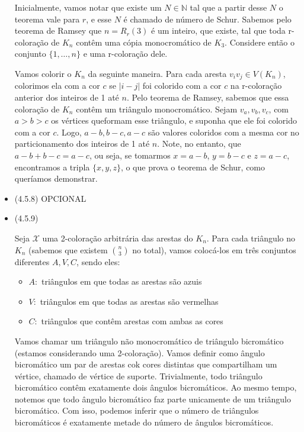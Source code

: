 \documentclass{article}
\begin{document}
\begin{itemize}
	      Inicialmente, vamos notar que existe um \(N \in \mathbb{N}\) tal que a partir desse \(N\) o teorema vale para \(r\), e esse \(N\) é chamado de número de
	      Schur. Sabemos pelo teorema de Ramsey que \(n = R_r(3)\) é um inteiro, que existe, tal que
	      toda r-coloração de \(K_n\) contêm uma cópia monocromático de \(K_3\).
	      Considere então o conjunto \(\{1, \dots, n\}\) e uma r-coloração dele.

	      Vamos colorir o \(K_n\) da seguinte maneira. Para cada aresta \(v_iv_j \in V(K_n)\), colorimos ela com a cor \(c\) se \(|i - j|\) foi colorido com a cor
	      \(c\) na r-coloração anterior dos inteiros de 1 até \(n\). Pelo teorema de Ramsey, sabemos que essa coloração de \(K_n\) contêm um triângulo monocromático.
	      Sejam \(v_a, v_b, v_c\), com \(a > b > c\) os vértices queformam esse triângulo, e suponha que ele foi colorido com a cor \(c\). Logo,
	      \(a - b, b - c, a - c\) são valores coloridos com a mesma cor no particionamento dos inteiros de 1 até \(n\). Note, no entanto, que
	      \(a - b + b - c = a - c\), ou seja, se tomarmos \(x = a - b\), \(y = b - c\) e \(z = a - c\), encontramos a tripla \(\{x,y,z\}\), o que prova o
	      teorema de Schur, como queríamos demonstrar.

	\item (4.5.8) OPCIONAL
	\item (4.5.9)

	      Seja $\mathcal{X}$ uma 2-coloração arbitrária das arestas do \(K_n\). Para cada triângulo no \(K_n\) (sabemos que existem \(\binom{n}{3}\) no total), vamos colocá-los em três
	      conjuntos diferentes \(A, V, C\), sendo eles:

	      \begin{itemize}
		      \item \(A:\) triângulos em que todas as arestas são azuis
		      \item \(V:\) triângulos em que todas as arestas são vermelhas
		      \item \(C:\) triângulos que contêm arestas com ambas as cores
	      \end{itemize}

	      Vamos chamar um triângulo não monocromático de triângulo bicromático (estamos considerando uma 2-coloração). Vamos definir como ângulo bicromático
	      um par de arestas cok cores distintas que compartilham um vértice, chamado de vértice de suporte. Trivialmente, todo triângulo bicromático contêm exatamente dois ângulos bicromáticos. Ao mesmo tempo,
	      notemos que todo ângulo bicromático faz parte unicamente de um triângulo bicromático. Com isso, podemos inferir que o número de triângulos bicromáticos
	      é exatamente metade do número de ângulos bicromáticos.


\end{itemize}
\end{document}
